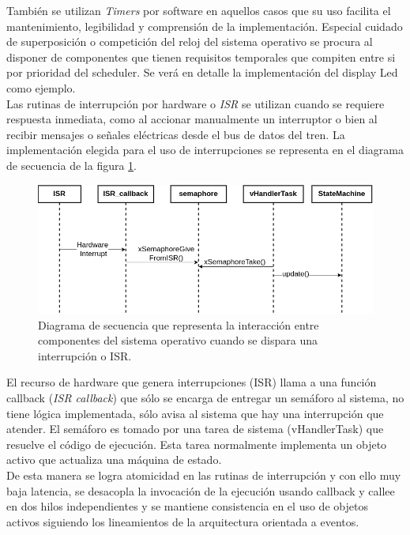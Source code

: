 También se utilizan \textit{Timers} por software en aquellos casos que su uso facilita el mantenimiento, legibilidad y comprensión de la implementación. Especial cuidado de superposición o competición del reloj del sistema operativo se procura al disponer de componentes que tienen requisitos temporales que compiten entre si por prioridad del scheduler. Se verá en detalle la implementación del display Led como ejemplo.\\

Las rutinas de interrupción por hardware o \textit{ISR} se utilizan cuando se requiere respuesta inmediata, como al accionar manualmente un interruptor o bien al recibir mensajes o señales eléctricas desde el bus de datos del tren. La implementación elegida para el uso de interrupciones se representa en el diagrama de secuencia de la figura \ref{fig:ISR}. \\

\begin{figure}[ht]
	\centering
	\includegraphics[width=1\textwidth]{./Figures/ISR_semaphore.png}
	\caption{Diagrama de secuencia que representa la interacción entre componentes del sistema operativo cuando se dispara una interrupción o ISR.}
	\label{fig:ISR}
\end{figure}

El recurso de hardware que genera interrupciones (ISR) llama a una función callback (\textit{ISR callback}) que sólo se encarga de entregar un semáforo al sistema, no tiene lógica implementada, sólo avisa al sistema que hay una interrupción que atender. El semáforo es tomado por una tarea de sistema (vHandlerTask) que resuelve el código de ejecución. Esta tarea normalmente implementa un objeto activo que actualiza una máquina de estado.\\

De esta manera se logra atomicidad en las rutinas de interrupción y con ello muy baja latencia, se desacopla la invocación de la ejecución usando callback y callee en dos hilos independientes y se mantiene consistencia en el uso de objetos activos siguiendo los lineamientos de la arquitectura orientada a eventos.\\


